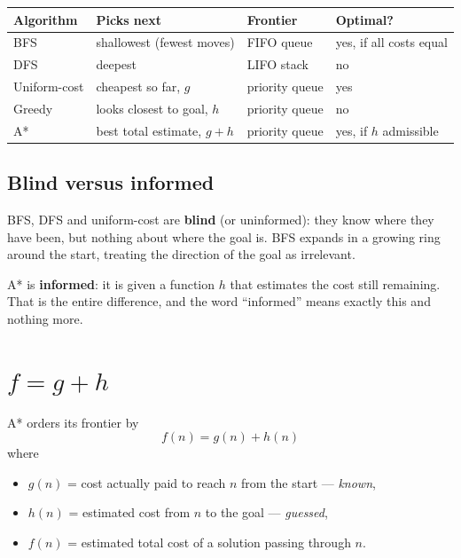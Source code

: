 \documentclass[11pt,a4paper]{article}
\begin{document}
\begin{center}
\begin{tabular}{@{}llll@{}}
\toprule
\textbf{Algorithm} & \textbf{Picks next} & \textbf{Frontier} & \textbf{Optimal?} \\
\midrule
BFS            & shallowest (fewest moves)      & FIFO queue     & yes, if all costs equal \\
DFS            & deepest                        & LIFO stack     & no \\
Uniform-cost   & cheapest so far, $g$           & priority queue & yes \\
Greedy         & looks closest to goal, $h$     & priority queue & no \\
A*             & best total estimate, $g + h$   & priority queue & yes, if $h$ admissible \\
\bottomrule
\end{tabular}
\end{center}

\subsection{Blind versus informed}

BFS, DFS and uniform-cost are \textbf{blind} (or uninformed): they know where
they have been, but nothing about where the goal is. BFS expands in a growing
ring around the start, treating the direction of the goal as irrelevant.

A* is \textbf{informed}: it is given a function $h$ that estimates the cost still
remaining. That is the entire difference, and the word ``informed'' means exactly
this and nothing more.

\section{\texorpdfstring{$f = g + h$}{f = g + h}}

A* orders its frontier by
\[
  f(n) = g(n) + h(n)
\]
where
\begin{itemize}
  \item $g(n)$ = cost actually paid to reach $n$ from the start --- \emph{known},
  \item $h(n)$ = estimated cost from $n$ to the goal --- \emph{guessed},
  \item $f(n)$ = estimated total cost of a solution passing through $n$.
\end{itemize}
\end{document}
